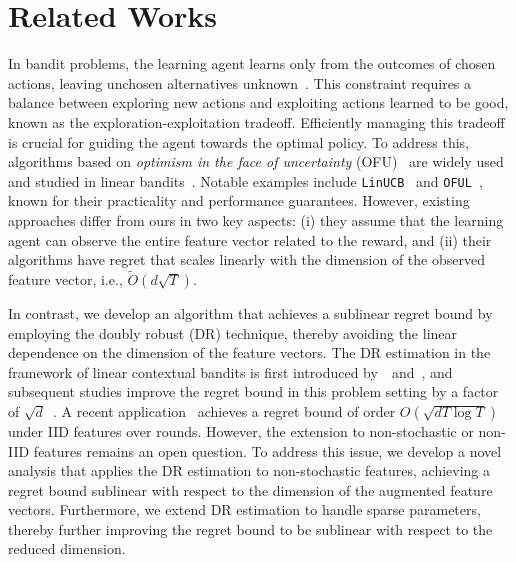 \section{Related Works}
\label{sec:related_works}
In bandit problems, the learning agent learns only from the outcomes of chosen actions, leaving unchosen alternatives unknown~\citep{robbins1952some}. 
This constraint requires a balance between exploring new actions and exploiting actions learned to be good, known as the exploration-exploitation tradeoff. 
Efficiently managing this tradeoff is crucial for guiding the agent towards the optimal policy.
To address this, algorithms based on \textit{optimism in the face of uncertainty} (OFU)~\citep{lai1985asymptotically} are widely used and studied in linear bandits~\citep{abe1999associative,auer2002using,dani2008stochastic,rusmevichientong2010linearly}. 
Notable examples include \texttt{LinUCB}~\citep{li2010contextual-bandit,chu2011contextual} and \texttt{OFUL}~\citep{abbasi-yadkori2011improved}, known for their practicality and performance guarantees. 
However, existing approaches differ from ours in two key aspects: (i) they assume that the learning agent can observe the entire feature vector related to the reward, and (ii) their algorithms have regret that scales linearly with the dimension of the observed feature vector, i.e., $\tilde{O}(d\sqrt{T})$. 

In contrast, we develop an algorithm that achieves a sublinear regret bound by employing the doubly robust (DR) technique, thereby avoiding the linear dependence on the dimension of the feature vectors.
The DR estimation in the framework of linear contextual bandits is first introduced by~\citet{kim2019doubly-robust}~and~\citet{dimakopoulou2019balanced}, and subsequent studies improve the regret bound in this problem setting by a factor of $\sqrt{d}$~\citep{kim2021doubly,kim2023double}.
A recent application~\citep{kim2023squeeze} achieves a regret bound of order $O(\sqrt{dT\log T})$ under IID features over rounds.
However, the extension to non-stochastic or non-IID features remains an open question.
To address this issue, we develop a novel analysis that applies the DR estimation to non-stochastic features, achieving a regret bound sublinear with respect to the dimension of the augmented feature vectors. 
Furthermore, we extend DR estimation to handle sparse parameters, thereby further improving the regret bound to be sublinear with respect to the reduced dimension.

